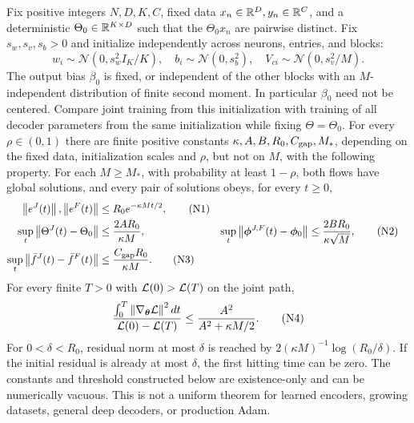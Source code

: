 \begin{theorem}
\label{thm:astra_nonlinear}
Fix positive integers $N,D,K,C$, fixed data $x_n\in\mathbb{R}^D,y_n\in\mathbb{R}^C$,
and a deterministic $\Theta_0\in\mathbb{R}^{K\times D}$ such that the
$\Theta_0x_n$ are pairwise distinct. Fix $s_w,s_v,s_b>0$ and initialize
independently across neurons, entries, and blocks:
\[
 w_i\sim\mathcal N(0,s_w^2 I_K/K),\quad
 b_i\sim\mathcal N(0,s_b^2),\quad
 V_{ci}\sim\mathcal N(0,s_v^2/M).
\]
The output bias $\beta_0$ is fixed, or independent of the other blocks
with an $M$-independent distribution of finite second moment. In
particular $\beta_0$ need not be centered. Compare joint training from
this initialization with training of all decoder parameters from the
same initialization while fixing $\Theta=\Theta_0$.
For every $\rho\in(0,1)$ there are finite positive constants
$\kappa,A,B,R_0,C_{\rm gap},M_*$, depending on the fixed data,
initialization scales and $\rho$, but not on $M$, with the following
property. For each $M\ge M_*$, with probability at least $1-\rho$,
both flows have global solutions, and every pair of solutions obeys,
for every $t\ge0$,
\begin{align*}
 \left\lVert e^J(t)\right\rVert,\left\lVert e^F(t)\right\rVert
   &\le R_0e^{-\kappa Mt/2}, \tag{N1}\label{eq:astra_n1}\\
 \sup_t\left\lVert\Theta^J(t)-\Theta_0\right\rVert
   &\le\frac{2AR_0}{\kappa M},&
 \sup_t\left\lVert{\boldsymbol{\phi}}^{J,F}(t)-{\boldsymbol{\phi}}_0\right\rVert
   &\le\frac{2BR_0}{\kappa\sqrt M}, \tag{N2}\label{eq:astra_n2}\\
 \sup_t\left\lVert\bar f^J(t)-\bar f^F(t)\right\rVert
   &\le\frac{C_{\rm gap}R_0}{\kappa M}. \tag{N3}\label{eq:astra_n3}
\end{align*}
For every finite $T>0$ with $\mathcal{L}(0)>\mathcal{L}(T)$ on the joint path,
\begin{equation*}
 \frac{\int_0^T\left\lVert\nabla_{{\boldsymbol{\theta}}}\mathcal{L}\right\rVert^2dt}
 {\mathcal{L}(0)-\mathcal{L}(T)}
 \le\frac{A^2}{A^2+\kappa M/2}. \tag{N4}\label{eq:astra_n4}
\end{equation*}
For $0<\delta<R_0$, residual norm at most $\delta$ is reached by
$2(\kappa M)^{-1}\log(R_0/\delta)$. If the initial residual is already
at most $\delta$, the first hitting time can be zero.
The constants and threshold constructed below are existence-only and
can be numerically vacuous. This is not a uniform theorem for learned
encoders, growing datasets, general deep decoders, or production Adam.
\end{theorem}

